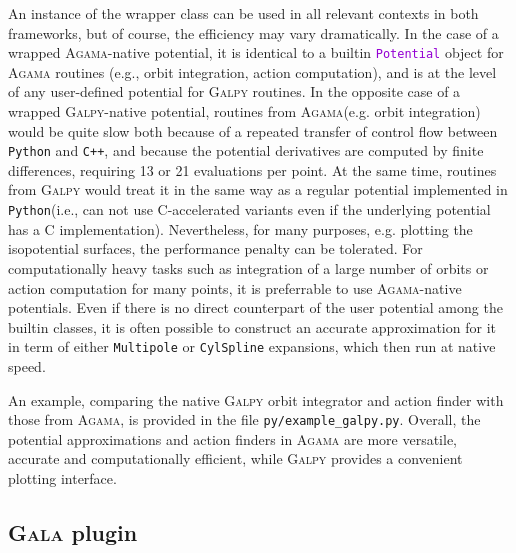 \documentclass[12pt]{article}
\newcommand{\Agama}{\textsc{Agama}\xspace}
\newcommand{\Galpy}{\textsc{Galpy}\xspace}
\newcommand{\Gala} {\textsc{Gala}\xspace}
\newcommand{\Cpp}  {\texttt{C++}\xspace}
\newcommand{\Python}{\texttt{Python}\xspace}
\newcommand{\ttt}[1]{\textcolor{darkviolet}{\texttt{#1}}}
\newcommand{\ppp}[1]{\textcolor{darkolive} {\texttt{#1}}}
\begin{document}
An instance of the wrapper class can be used in all relevant contexts in both frameworks, but of course, the efficiency may vary dramatically. In the case of a wrapped \Agama-native potential, it is identical to a builtin \ttt{Potential} object for \Agama routines (e.g., orbit integration, action computation), and is at the level of any user-defined potential for \Galpy routines. In the opposite case of a wrapped \Galpy-native potential, routines from \Agama (e.g. orbit integration) would be quite slow both because of a repeated transfer of control flow between \Python and \Cpp, and because the potential derivatives are computed by finite differences, requiring 13 or 21 evaluations per point. At the same time, routines from \Galpy would treat it in the same way as a regular potential implemented in \Python (i.e., can not use C-accelerated variants even if the underlying potential has a C implementation). Nevertheless, for many purposes, e.g. plotting the isopotential surfaces, the performance penalty can be tolerated. For computationally heavy tasks such as integration of a large number of orbits or action computation for many points, it is preferrable to use \Agama-native potentials. Even if there is no direct counterpart of the user potential among the builtin classes, it is often possible to construct an accurate approximation for it in term of either \ppp{Multipole} or \ppp{CylSpline} expansions, which then run at native speed.

An example, comparing the native \Galpy orbit integrator and action finder with those from \Agama, is provided in the file \texttt{py/example_galpy.py}. Overall, the potential approximations and action finders in \Agama are more versatile, accurate and computationally efficient, while \Galpy provides a convenient plotting interface.


\subsection{\Gala plugin}  \label{sec:Gala}
\end{document}
